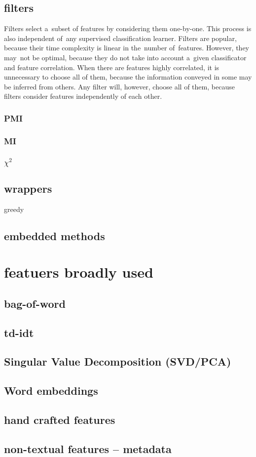 \subsection{filters}

Filters select a~subset of features by considering them one-by-one. This process is also independent of~any supervised classification learner. Filters are popular, because their time complexity is linear in the~number of~features. However, they may~not be optimal, because they do not take into account a~given classificator and feature correlation. When there are features highly correlated, it is unnecessary to choose all of them, because the information conveyed in some may be inferred from others. Any filter will, however, choose all of them, because filters consider features independently of each other.

\subsubsection{PMI}

\subsubsection{MI}

\subsubsection{$\chi^2$}

\subsection{wrappers}

greedy

\subsection{embedded methods}

\section{featuers broadly used}

\subsection{bag-of-word}

\subsection{td-idt}

\subsection{Singular Value Decomposition (SVD/PCA)}

\subsection{Word embeddings}

\subsection{hand crafted features}

\subsection{non-textual features -- metadata}
